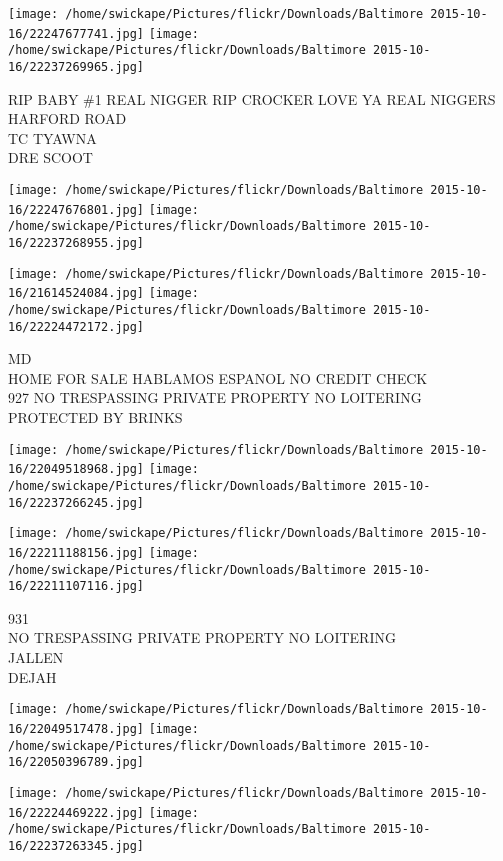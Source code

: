 \documentclass[10pt,letterpaper]{article}
\begin{document}
\texttt{[image: /home/swickape/Pictures/flickr/Downloads/Baltimore 2015-10-16/22247677741.jpg]}
\texttt{[image: /home/swickape/Pictures/flickr/Downloads/Baltimore 2015-10-16/22237269965.jpg]}

RIP BABY \#1  REAL NIGGER RIP CROCKER LOVE YA REAL NIGGERS\\
HARFORD ROAD\\
TC TYAWNA\\
DRE SCOOT
\pagebreak

\texttt{[image: /home/swickape/Pictures/flickr/Downloads/Baltimore 2015-10-16/22247676801.jpg]}
\texttt{[image: /home/swickape/Pictures/flickr/Downloads/Baltimore 2015-10-16/22237268955.jpg]}

\texttt{[image: /home/swickape/Pictures/flickr/Downloads/Baltimore 2015-10-16/21614524084.jpg]}
\texttt{[image: /home/swickape/Pictures/flickr/Downloads/Baltimore 2015-10-16/22224472172.jpg]}

MD\\
HOME FOR SALE HABLAMOS ESPANOL NO CREDIT CHECK\\
927 NO TRESPASSING PRIVATE PROPERTY NO LOITERING\\
PROTECTED BY BRINKS
\pagebreak

\texttt{[image: /home/swickape/Pictures/flickr/Downloads/Baltimore 2015-10-16/22049518968.jpg]}
\texttt{[image: /home/swickape/Pictures/flickr/Downloads/Baltimore 2015-10-16/22237266245.jpg]}

\texttt{[image: /home/swickape/Pictures/flickr/Downloads/Baltimore 2015-10-16/22211188156.jpg]}
\texttt{[image: /home/swickape/Pictures/flickr/Downloads/Baltimore 2015-10-16/22211107116.jpg]}

931\\
NO TRESPASSING PRIVATE PROPERTY NO LOITERING\\
JALLEN\\
DEJAH
\pagebreak

\texttt{[image: /home/swickape/Pictures/flickr/Downloads/Baltimore 2015-10-16/22049517478.jpg]}
\texttt{[image: /home/swickape/Pictures/flickr/Downloads/Baltimore 2015-10-16/22050396789.jpg]}

\texttt{[image: /home/swickape/Pictures/flickr/Downloads/Baltimore 2015-10-16/22224469222.jpg]}
\texttt{[image: /home/swickape/Pictures/flickr/Downloads/Baltimore 2015-10-16/22237263345.jpg]}
\end{document}

